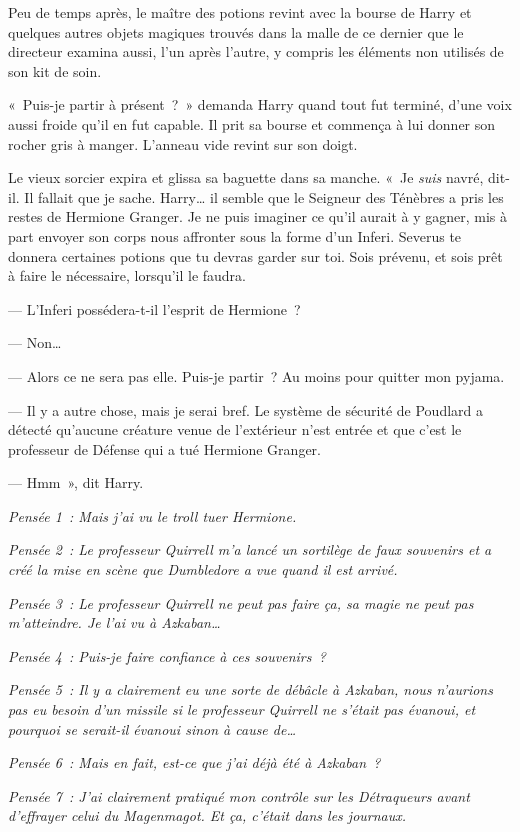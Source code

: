 Peu de temps après, le maître des potions revint avec la bourse de Harry et quelques autres objets magiques trouvés dans la malle de ce dernier que le directeur examina aussi, l'un après l'autre, y compris les éléments non utilisés de son kit de soin.

«~Puis-je partir à présent~?~»
demanda Harry quand tout fut terminé, d'une voix aussi froide qu'il en fut capable.
Il prit sa bourse et commença à lui donner son rocher gris à manger.
L'anneau vide revint sur son doigt.

Le vieux sorcier expira et glissa sa baguette dans sa manche.
«~Je \emph{suis} navré, dit-il.
Il fallait que je sache.
Harry… il semble que le Seigneur des Ténèbres a pris les restes de Hermione Granger.
Je ne puis imaginer ce qu'il aurait à y gagner, mis à part envoyer son corps nous affronter sous la forme d'un Inferi.
Severus te donnera certaines potions que tu devras garder sur toi.
Sois prévenu, et sois prêt à faire le nécessaire, lorsqu'il le faudra.

--- L'Inferi possédera-t-il l'esprit de Hermione~?

--- Non…

--- Alors ce ne sera pas elle.
Puis-je partir~?
Au moins pour quitter mon pyjama.

--- Il y a autre chose, mais je serai bref.
Le système de sécurité de Poudlard a détecté qu'aucune créature venue de l'extérieur n'est entrée et que c'est le professeur de Défense qui a tué Hermione Granger.

--- Hmm~», dit Harry.

\emph{Pensée 1~: Mais j'ai vu le troll tuer Hermione.}

\emph{Pensée 2~: Le professeur Quirrell m'a lancé un sortilège de faux souvenirs et a créé la mise en scène que Dumbledore a vue quand il est arrivé.}

\emph{Pensée 3~: Le professeur Quirrell ne peut pas faire ça, sa magie ne peut pas m'atteindre.
Je l'ai vu à Azkaban…}

\emph{Pensée 4~: Puis-je faire confiance à ces souvenirs~?}

\emph{Pensée 5~: Il y a clairement eu une sorte de débâcle à Azkaban, nous n'aurions pas eu besoin d'un missile si le professeur Quirrell ne s'était pas évanoui, et pourquoi se serait-il évanoui sinon à cause de…}

\emph{Pensée 6~: Mais en fait, est-ce que j'ai déjà été à Azkaban~?}

\emph{Pensée 7~: J'ai clairement pratiqué mon contrôle sur les Détraqueurs avant d'effrayer celui du Magenmagot.
Et \emph{ça}, c'était dans les journaux.}

